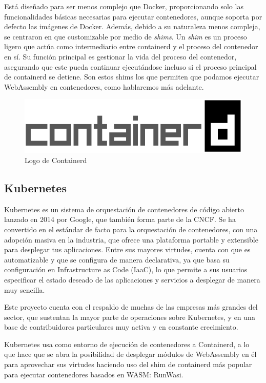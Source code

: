 Está diseñado para ser menos complejo que Docker, proporcionando solo las funcionalidades básicas necesarias para ejecutar contenedores, aunque soporta por defecto las imágenes de Docker. Además, debido a su naturaleza menos compleja, se centraron en que customizable por medio de \textit{shims}. Un \textit{shim} es un proceso ligero que actúa como intermediario entre containerd y el proceso del contenedor en sí. Su función principal es gestionar la vida del proceso del contenedor, asegurando que este pueda continuar ejecutándose incluso si el proceso principal de containerd se detiene. Son estos shims los que permiten que podamos ejecutar WebAssembly en contenedores, como hablaremos más adelante.

\begin{figure}[h!]
    \centering
    \includegraphics[width=0.5\linewidth]{figures/containerd-horizontal-color.png}
    \caption{Logo de Containerd}
    \label{fig:Containerd-Logo}
\end{figure}

\subsection{Kubernetes}

Kubernetes es un sistema de orquestación de contenedores de código abierto lanzado en 2014 por Google, que también forma parte de la CNCF. Se ha convertido en el estándar de facto para la orquestación de contenedores, con una adopción masiva en la industria, que ofrece una plataforma portable y extensible para desplegar tus aplicaciones. Entre sus mayores virtudes, cuenta con que es automatizable y que se configura de manera declarativa, ya que basa su configuración en Infrastructure as Code (IaaC), lo que permite a sus usuarios especificar el estado deseado de las aplicaciones y servicios a desplegar de manera muy sencilla.

Este proyecto cuenta con el respaldo de muchas de las empresas más grandes del sector, que sustentan la mayor parte de operaciones sobre Kubernetes, y en una base de contribuidores particulares muy activa y en constante crecimiento.

Kubernetes usa como entorno de ejecución de contenedores a Containerd, a lo que hace que se abra la posibilidad de desplegar módulos de WebAssembly en él para aprovechar sus virtudes haciendo uso del shim de containerd más popular para ejecutar contenedores basados en WASM: RunWasi.

